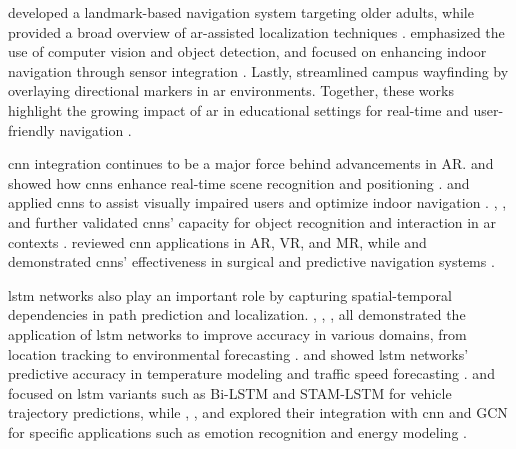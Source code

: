 \begin{refsection}
\citeauthor{twelve} \citeyear{twelve} developed a landmark-based navigation system targeting older adults, while \citeauthor{fourteen} \citeyear{fourteen} provided a broad overview of \gls{ar}-assisted localization techniques \cite{twelve, fourteen}. \citeauthor{five} \citeyear{five} emphasized the use of computer vision and object detection, and \citeauthor{eleven} \citeyear{eleven}focused on enhancing indoor navigation through sensor integration \cite{five, eleven}. Lastly, \citeauthor{fifteen} \citeyear{fifteen} streamlined campus wayfinding by overlaying directional markers in \gls{ar} environments. Together, these works highlight the growing impact of \gls{ar} in educational settings for real-time and user-friendly navigation \cite{fifteen}.

\gls{cnn} integration continues to be a major force behind advancements in AR. \citeauthor{twentytwo} \citeyear{twentytwo} and \citeauthor{twenty} \citeyear{twenty} showed how \gls{cnn}s enhance real-time scene recognition and positioning \cite{twentytwo, twenty}. \citeauthor{sixteen} \citeyear{sixteen} and \citeauthor{seventeen} \citeyear{seventeen} applied \gls{cnn}s to assist visually impaired users and optimize indoor navigation \cite{sixteen, seventeen}. \citeauthor{twentyfive} \citeyear{twentyfive}, \citeauthor{eighteen} \citeyear{eighteen}, and \citeauthor{twentyone} \citeyear{twentyone} further validated \gls{cnn}s’ capacity for object recognition and interaction in \gls{ar} contexts \cite{twentyfive, eighteen, twentyone}. \citeauthor{nineteen} \citeyear{nineteen} reviewed \gls{cnn} applications in AR, VR, and MR, while \citeauthor{twentyfour} \citeyear{twentyfour} and \citeauthor{twentythree} \citeyear{twentythree} demonstrated \gls{cnn}s' effectiveness in surgical and predictive navigation systems \cite{nineteen, twentyfour, twentythree}.

\gls{lstm} networks also play an important role by capturing spatial-temporal dependencies in path prediction and localization. \citeauthor{twentysix} \citeyear{twentysix}, \citeauthor{twentyseven} \citeyear{twentyseven}, \citeauthor{twentyeight} \citeyear{twentyeight}, all demonstrated the application of \gls{lstm} networks to improve accuracy in various domains, from location tracking to environmental forecasting \cite{twentysix, twentyseven, twentyeight}. \citeauthor{twentynine} \citeyear{twentynine} and \citeauthor{thirty} \citeyear{thirty} showed \gls{lstm} networks' predictive accuracy in temperature modeling and traffic speed forecasting \cite{twentynine, thirty}. \citeauthor{thirtyone} \citeyear{thirtyone} and \citeauthor{thirtytwo} \citeyear{thirtytwo} focused on \gls{lstm} variants such as Bi-LSTM and STAM-LSTM for vehicle trajectory predictions, while \citeauthor{thirtythree} \citeyear{thirtythree}, \citeauthor{thirtyfour} \citeyear{thirtyfour}, and \citeauthor{thirtyfive} \citeyear{thirtyfive} explored their integration with \gls{cnn} and GCN for specific applications such as emotion recognition and energy modeling \cite{thirtyone, thirtytwo, thirtythree, thirtyfour, thirtyfive}.


\end{refsection}
